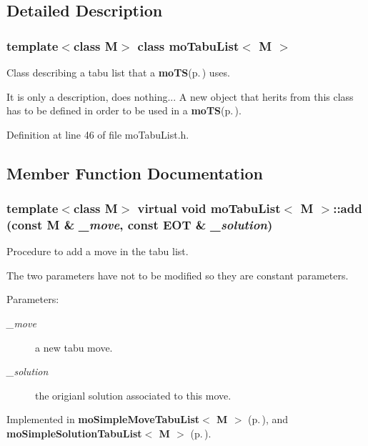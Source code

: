\subsection{Detailed Description}
\subsubsection*{template$<$class M$>$ class mo\-Tabu\-List$<$ M $>$}

Class describing a tabu list that a {\bf mo\-TS}{\rm (p.\,\pageref{classmo_t_s})} uses. 

It is only a description, does nothing... A new object that herits from this class has to be defined in order to be used in a {\bf mo\-TS}{\rm (p.\,\pageref{classmo_t_s})}. 



Definition at line 46 of file mo\-Tabu\-List.h.

\subsection{Member Function Documentation}
\subsubsection{\setlength{\rightskip}{0pt plus 5cm}template$<$class M$>$ virtual void {\bf mo\-Tabu\-List}$<$ M $>$::add (const M \& {\em \_\-move}, const {\bf EOT} \& {\em \_\-solution})\hspace{0.3cm}{\tt  [pure virtual]}}\label{classmo_tabu_list_a0}


Procedure to add a move in the tabu list. 

The two parameters have not to be modified so they are constant parameters.

\begin{Desc}
\item[Parameters:]
\begin{description}
\item[{\em \_\-move}]a new tabu move. \item[{\em \_\-solution}]the origianl solution associated to this move. \end{description}
\end{Desc}


Implemented in {\bf mo\-Simple\-Move\-Tabu\-List$<$ M $>$} {\rm (p.\,\pageref{classmo_simple_move_tabu_list_a2})}, and {\bf mo\-Simple\-Solution\-Tabu\-List$<$ M $>$} {\rm (p.\,\pageref{classmo_simple_solution_tabu_list_a2})}.
